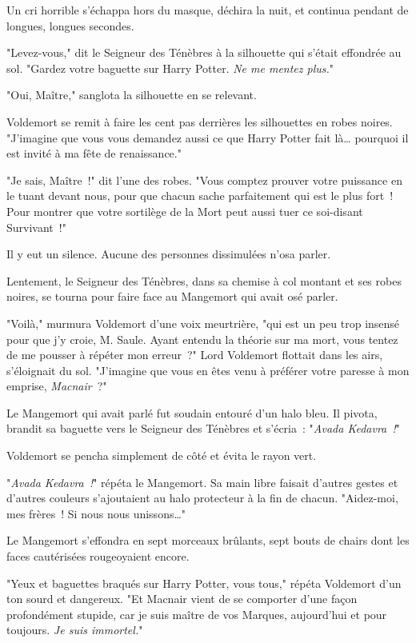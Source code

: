 Un cri horrible s'échappa hors du masque, déchira la nuit, et continua pendant de longues, longues secondes.

"Levez-vous," dit le Seigneur des Ténèbres à la silhouette qui s'était effondrée au sol. "Gardez votre baguette sur Harry Potter. \emph{Ne me mentez plus.}"

"Oui, Maître," sanglota la silhouette en se relevant.

Voldemort se remit à faire les cent pas derrières les silhouettes en robes noires. "J'imagine que vous vous demandez aussi ce que Harry Potter fait là… pourquoi il est invité à ma fête de renaissance."

"Je sais, Maître~!" dit l'une des robes. "Vous comptez prouver votre puissance en le tuant devant nous, pour que chacun sache parfaitement qui est le plus fort~! Pour montrer que votre sortilège de la Mort peut aussi tuer ce soi-disant Survivant~!"

Il y eut un silence. Aucune des personnes dissimulées n'osa parler.

Lentement, le Seigneur des Ténèbres, dans sa chemise à col montant et ses robes noires, se tourna pour faire face au Mangemort qui avait osé parler.

"Voilà," murmura Voldemort d'une voix meurtrière, "qui est un peu trop insensé pour que j'y croie, M. Saule. Ayant entendu la théorie sur ma mort, vous tentez de me pousser à répéter mon erreur~?" Lord Voldemort flottait dans les airs, s'éloignait du sol. "J'imagine que vous en êtes venu à préférer votre paresse à mon emprise, \emph{Macnair}~?"

Le Mangemort qui avait parlé fut soudain entouré d'un halo bleu. Il pivota, brandit sa baguette vers le Seigneur des Ténèbres et s'écria~: "\emph{Avada Kedavra~!}"

Voldemort se pencha simplement de côté et évita le rayon vert.

"\emph{Avada Kedavra~!}" répéta le Mangemort. Sa main libre faisait d'autres gestes et d'autres couleurs s'ajoutaient au halo protecteur à la fin de chacun. "Aidez-moi, mes frères~! Si nous nous unissons…"

Le Mangemort s'effondra en sept morceaux brûlants, sept bouts de chairs dont les faces cautérisées rougeoyaient encore.

"Yeux et baguettes braqués sur Harry Potter, vous tous," répéta Voldemort d'un ton sourd et dangereux. "Et Macnair vient de se comporter d'une façon profondément stupide, car je suis maître de vos Marques, aujourd'hui et pour toujours. \emph{Je suis immortel.}"

